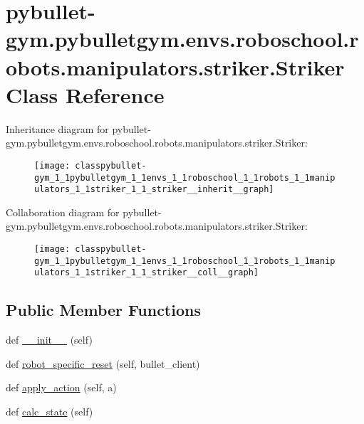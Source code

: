 \hypertarget{classpybullet-gym_1_1pybulletgym_1_1envs_1_1roboschool_1_1robots_1_1manipulators_1_1striker_1_1_striker}{}\section{pybullet-\/gym.pybulletgym.\+envs.\+roboschool.\+robots.\+manipulators.\+striker.\+Striker Class Reference}
\label{classpybullet-gym_1_1pybulletgym_1_1envs_1_1roboschool_1_1robots_1_1manipulators_1_1striker_1_1_striker}


Inheritance diagram for pybullet-\/gym.pybulletgym.\+envs.\+roboschool.\+robots.\+manipulators.\+striker.\+Striker\+:
\nopagebreak
\begin{figure}[H]
\begin{center}
\leavevmode
\texttt{[image: classpybullet-gym\_1\_1pybulletgym\_1\_1envs\_1\_1roboschool\_1\_1robots\_1\_1manipulators\_1\_1striker\_1\_1\_striker\_\_inherit\_\_graph]}
\end{center}
\end{figure}


Collaboration diagram for pybullet-\/gym.pybulletgym.\+envs.\+roboschool.\+robots.\+manipulators.\+striker.\+Striker\+:
\nopagebreak
\begin{figure}[H]
\begin{center}
\leavevmode
\texttt{[image: classpybullet-gym\_1\_1pybulletgym\_1\_1envs\_1\_1roboschool\_1\_1robots\_1\_1manipulators\_1\_1striker\_1\_1\_striker\_\_coll\_\_graph]}
\end{center}
\end{figure}
\subsection*{Public Member Functions}
\begin{DoxyCompactItemize}
\item 
def \hyperlink{classpybullet-gym_1_1pybulletgym_1_1envs_1_1roboschool_1_1robots_1_1manipulators_1_1striker_1_1_striker_a9a9f6ec68351e2d812bc3cc84290b39a}{\+\_\+\+\_\+init\+\_\+\+\_\+} (self)
\item 
def \hyperlink{classpybullet-gym_1_1pybulletgym_1_1envs_1_1roboschool_1_1robots_1_1manipulators_1_1striker_1_1_striker_a939db0bf081ac051c41cfaf8d17b62ae}{robot\+\_\+specific\+\_\+reset} (self, bullet\+\_\+client)
\item 
def \hyperlink{classpybullet-gym_1_1pybulletgym_1_1envs_1_1roboschool_1_1robots_1_1manipulators_1_1striker_1_1_striker_a73985c90ea8561ff21a5405411b0988d}{apply\+\_\+action} (self, a)
\item 
def \hyperlink{classpybullet-gym_1_1pybulletgym_1_1envs_1_1roboschool_1_1robots_1_1manipulators_1_1striker_1_1_striker_a970b4d6645a3cec033c7336e4349ef23}{calc\+\_\+state} (self)
\end{DoxyCompactItemize}
